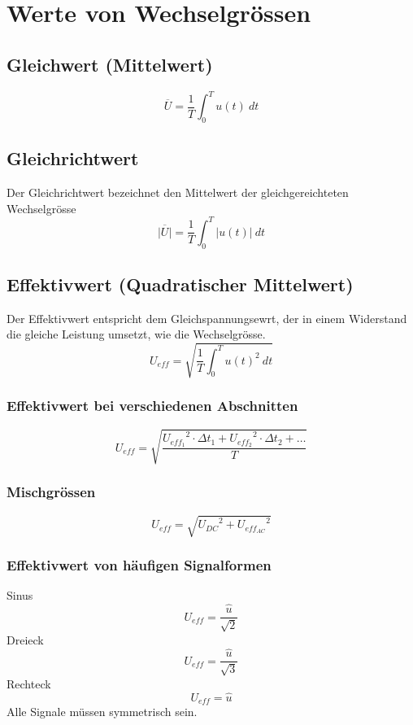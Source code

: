 



\section{Werte von Wechselgrössen}

\subsection{Gleichwert (Mittelwert)}
\[ \overline{U} = \frac{1}{T} \int_0^T u(t) ~ dt \]

\subsection{Gleichrichtwert}
Der Gleichrichtwert bezeichnet den Mittelwert der gleichgereichteten 
Wechselgrösse
\[ \overline{|U|} = \frac{1}{T} \int_0^T |u(t)| ~ dt \]

\subsection{Effektivwert (Quadratischer Mittelwert)}
Der Effektivwert entspricht dem Gleichspannungsewrt, der in einem Widerstand 
die gleiche Leistung umsetzt, wie die Wechselgrösse. 
\[ U_{eff} = \sqrt{\frac{1}{T} \int_0^T u(t)^2 ~ dt} \]

\subsubsection{Effektivwert bei verschiedenen Abschnitten}
\[ U_{eff} = \sqrt{\frac{{U_{eff_1}}^2 \cdot \Delta t_1 
+ {U_{eff_2}}^2 \cdot \Delta t_2 + \dots}{T}} \]

\subsubsection{Mischgrössen}
\[ U_{eff} = \sqrt{{U_{DC}}^2 + {U_{eff_{AC}}}^2} \]

\subsubsection{Effektivwert von häufigen Signalformen}
Sinus
\[ U_{eff} = \frac{\hat{u}}{\sqrt{2}} \]
%
Dreieck
\[ U_{eff} = \frac{\hat{u}}{\sqrt{3}} \]
%
Rechteck
\[ U_{eff} = \hat{u} \]
%
Alle Signale müssen symmetrisch sein. 

